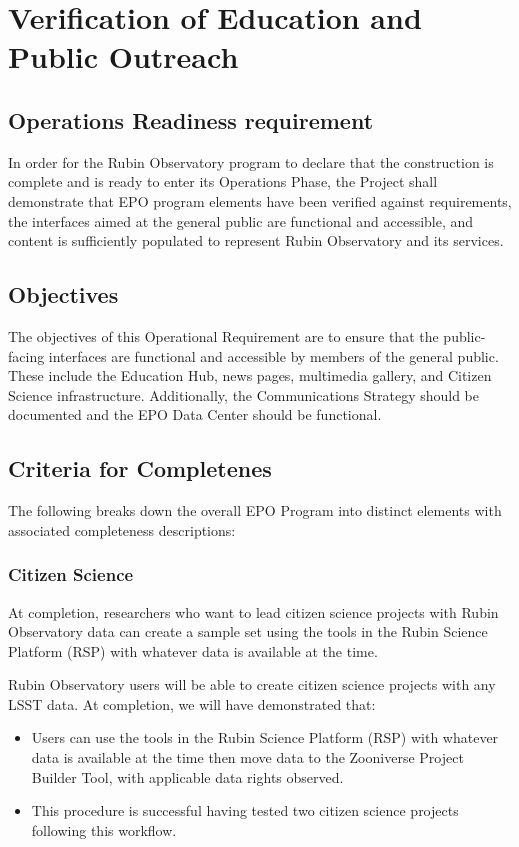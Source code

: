 \section{Verification of Education and Public Outreach}  \label{sec:community}

\subsection{Operations Readiness requirement}

In order for the Rubin Observatory program to declare that the construction is complete and is ready to enter its Operations Phase, the Project shall demonstrate that EPO program elements have been verified against requirements, the interfaces aimed at the general public are functional and accessible, and content is sufficiently populated to represent Rubin Observatory and its services. 

\subsection{Objectives}

The objectives of this Operational Requirement are to ensure that the public-facing interfaces are functional and accessible by members of the general public. These include the Education Hub, news pages, multimedia gallery, and Citizen Science infrastructure. Additionally, the Communications Strategy should be documented and the EPO Data Center should be functional.

\subsection{Criteria for Completenes}

The following breaks down the overall EPO Program into distinct elements with associated completeness descriptions:

\subsubsection{Citizen Science}

At completion, researchers who want to lead citizen science projects with Rubin Observatory data can create a sample set using the tools in the Rubin Science Platform (RSP) with whatever data is available at the time. 

Rubin Observatory users will be able to create citizen science projects with any LSST data.  At completion, we will have demonstrated that:
\begin{itemize}
	\item Users can use the tools in the Rubin Science Platform (RSP) with whatever data is available at the time then move data to the Zooniverse Project Builder Tool, with applicable data rights observed.
	\item This procedure is successful having tested two citizen science projects following this workflow.
\end{itemize} 

